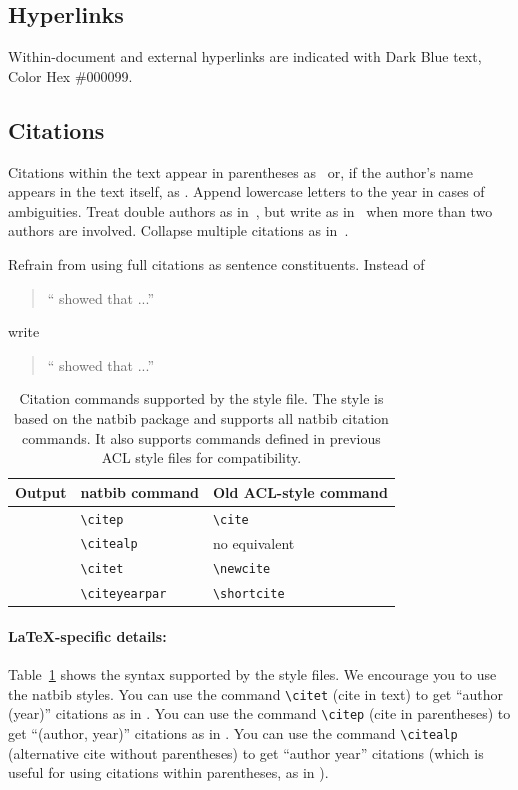\documentclass[11pt,a4paper]{article}
\begin{document}
\subsection{Hyperlinks}
Within-document and external hyperlinks are indicated with Dark Blue text, Color Hex \#000099.

\subsection{Citations}
Citations within the text appear in parentheses as~\citep{Gusfield:97} or, if the author's name appears in the text itself, as \citet{Gusfield:97}.
Append lowercase letters to the year in cases of ambiguities.  
Treat double authors as in~\citep{Aho:72}, but write as in~\citep{Chandra:81} when more than two authors are involved. Collapse multiple citations as in~\citep{Gusfield:97,Aho:72}. 

Refrain from using full citations as sentence constituents.
Instead of
\begin{quote}
  ``\citep{Gusfield:97} showed that ...''
\end{quote}
write
\begin{quote}
``\citet{Gusfield:97} showed that ...''
\end{quote}

\begin{table}
\centering
\begin{tabular}{lll}
\hline
\textbf{Output} & \textbf{natbib command} & \textbf{Old ACL-style command}\\
\hline
\citep{Gusfield:97} & \small\verb|\citep| & \small\verb|\cite| \\
\citealp{Gusfield:97} & \small\verb|\citealp| & no equivalent \\
\citet{Gusfield:97} & \small\verb|\citet| & \small\verb|\newcite| \\
\citeyearpar{Gusfield:97} & \small\verb|\citeyearpar| & \small\verb|\shortcite| \\
\hline
\end{tabular}
\caption{\label{citation-guide}
Citation commands supported by the style file.
The style is based on the natbib package and supports all natbib citation commands.
It also supports commands defined in previous ACL style files for compatibility.
}
\end{table}

\paragraph{\LaTeX-specific details:}
Table~\ref{citation-guide} shows the syntax supported by the style files.
We encourage you to use the natbib styles.
You can use the command {\small\verb|\citet|} (cite in text) to get ``author (year)'' citations as in \citet{Gusfield:97}.
You can use the command {\small\verb|\citep|} (cite in parentheses) to get ``(author, year)'' citations as in \citep{Gusfield:97}.
You can use the command {\small\verb|\citealp|} (alternative cite without  parentheses) to get ``author year'' citations (which is useful for  using citations within parentheses, as in \citealp{Gusfield:97}).
\end{document}
